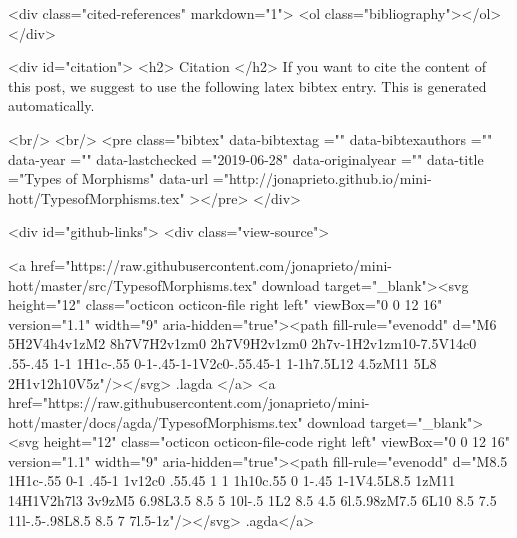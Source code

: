   <div class="cited-references" markdown="1">
  <ol class="bibliography"></ol>
  </div>


  
  <div id="citation">
  <h2> Citation </h2>
  If you want to cite the content of this post,
  we suggest to use the following latex bibtex entry.
  This is generated automatically.

  <br/>
  <br/>
  <pre class="bibtex"
       data-bibtextag =""
       data-bibtexauthors =""
       data-year =""
       data-lastchecked ="2019-06-28"
       data-originalyear =""
       data-title ="Types of Morphisms"
       data-url ="http://jonaprieto.github.io/mini-hott/TypesofMorphisms.tex"
  ></pre>
  </div>
  

  <div id="github-links">
    <div class="view-source">
      
        <a href="https://raw.githubusercontent.com/jonaprieto/mini-hott/master/src/TypesofMorphisms.tex" download target="_blank"><svg height="12" class="octicon octicon-file right left" viewBox="0 0 12 16" version="1.1" width="9" aria-hidden="true"><path fill-rule="evenodd" d="M6 5H2V4h4v1zM2 8h7V7H2v1zm0 2h7V9H2v1zm0 2h7v-1H2v1zm10-7.5V14c0 .55-.45 1-1 1H1c-.55 0-1-.45-1-1V2c0-.55.45-1 1-1h7.5L12 4.5zM11 5L8 2H1v12h10V5z"/></svg> .lagda </a>
        <a href="https://raw.githubusercontent.com/jonaprieto/mini-hott/master/docs/agda/TypesofMorphisms.tex" download target="_blank"><svg height="12" class="octicon octicon-file-code right left" viewBox="0 0 12 16" version="1.1" width="9" aria-hidden="true"><path fill-rule="evenodd" d="M8.5 1H1c-.55 0-1 .45-1 1v12c0 .55.45 1 1 1h10c.55 0 1-.45 1-1V4.5L8.5 1zM11 14H1V2h7l3 3v9zM5 6.98L3.5 8.5 5 10l-.5 1L2 8.5 4.5 6l.5.98zM7.5 6L10 8.5 7.5 11l-.5-.98L8.5 8.5 7 7l.5-1z"/></svg> .agda</a>
      
